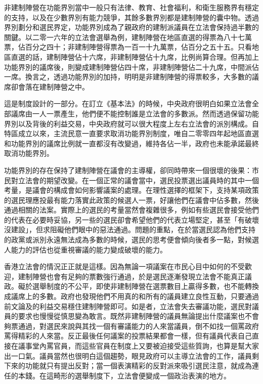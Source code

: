 非建制陣營在功能界別當中一般只有法律、教育、社會福利，和衛生服務界有穩定的支持，以及在少數界別有能力競爭，其餘多數界別都是建制陣營的囊中物。透過界別劃分和選民界定，功能界別成為了親政府的建制派議員在立法會保持過半數的關鍵。以二零一六年的立法會選舉為例，建制陣營在地區直選的得票為八十七萬票，佔百分之四十；非建制陣營得票為一百一十九萬票，佔百分之五十五。只看地區直選的話，建制陣營佔十六席，非建制陣營佔十九席，比例尚算合理。但再加上功能界別的議席後，則變成建制陣營佔四十席，非建制陣營佔二十九席，中間派佔一席。換言之，透過功能界別的加持，明明是非建制陣營的得票較多，大多數的議席卻會落在建制陣營之中。

這是制度設計的一部分。在訂立《基本法》的時候，中央政府很明白如果立法會全部議席由一人一票產生，他們便不能控制誰是立法會的多數派。然而透過保留功能界別以及背後的利益交易，中央政府就可以很大程度上左右立法會的派別構成。自特區成立以來，主流民意一直要求取消功能界別制度，唯自二零零四年起地區直選和功能界別的議席比例就一直都沒有改變過，維持各佔一半，政府也未能承諾最終取消功能界別。

功能界別的存在保持了建制陣營在議會的主導權，卻同時帶來一個很壞的後果：市民對立法會的期望改變。在一個正常的議會當中，選民投票選出議員時的其中一個考量，是議會的構成會如何影響議案的處理。在理性選擇的框架下，支持某項政策的選民理應投最有能力落實此政策的候選人一票，好讓他們在議會中佔多數，然後通過相關的法案。實際上的選民的考量當然會複雜很多，例如有些選民會接受他們的代表在必要時妥協，另一些的選民卻會希望他們的代表立場堅定，甚至「有破壞沒建設」，但求阻礙他們眼中的惡法通過。問題的重點，在於當選民認為他們支持的政黨或派別永遠無法成為多數的時候，選民的思考便會傾向後者多一點，對候選人能力的評估也從重視審議的能力變成破壞的能力。

香港立法會的情況正正就是這樣。因為無論一項議案在市民心目中如何的不受歡迎，建制陣營也會有足夠的票數強行通過，於是選民逐漸發現立法會不能真正議政。礙於選舉制度的不公平，即使非建制陣營在選票數目上贏得多數，也不能轉換成議席上的多數。政府也發現他們不用真的和所有的議員建立良性互動，只要通過前文論及的利益交易穩住建制陣營即可。如是者，立法會失去審議功能，選民對議員的要求也慢慢從慎思變為敢言。既然非建制陣營的議員無論提出什麼議案也不會夠票通過，對選民來說與其找一個有審議能力的人來當議員，倒不如找一個罵政府罵得精彩的人來當。反正最後任何議案的投票結果都會一樣，但有議員代表自己直接在議事堂內罵官員，而這些官員在制度上又要被迫接受這些質詢，也算是幫大家出一口氣。議員當然也很明白這個趨勢，眼見政府可以主導立法會的工作，議員剩下來的功能就只有提出反對；當一個表演精彩的反對派來吸引選民注意，就成為連任的本錢。在這畸形的選舉制度下，立法會便變成一個政治表演的地方。

